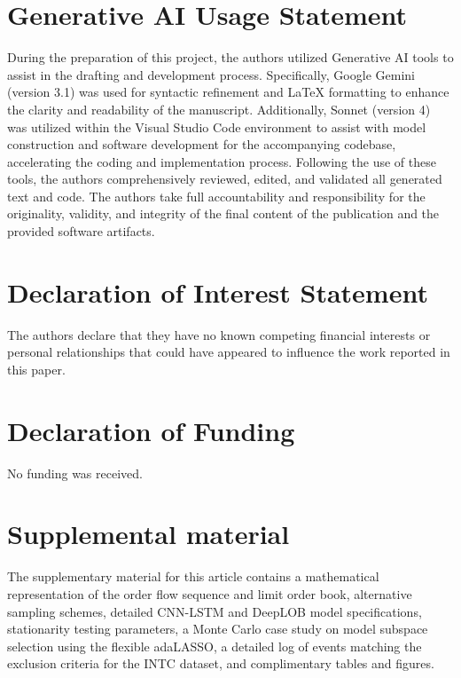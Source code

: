\documentclass{rQUF2e}
\theoremstyle{plain}
\theoremstyle{definition}
\theoremstyle{remark}
\begin{document}
\section*{Generative AI Usage Statement}
During the preparation of this project, the authors utilized Generative AI tools to assist in the drafting and development process. Specifically, Google Gemini (version 3.1) was used for syntactic refinement and LaTeX formatting to enhance the clarity and readability of the manuscript. Additionally, Sonnet (version 4) was utilized within the Visual Studio Code environment to assist with model construction and software development for the accompanying codebase, accelerating the coding and implementation process. Following the use of these tools, the authors comprehensively reviewed, edited, and validated all generated text and code. The authors take full accountability and responsibility for the originality, validity, and integrity of the final content of the publication and the provided software artifacts.

\section*{Declaration of Interest Statement}
The authors declare that they have no known competing financial interests or personal relationships that could have appeared to influence the work reported in this paper.

\section*{Declaration of Funding}
No funding was received.

\section*{Supplemental material}
The supplementary material for this article contains a mathematical representation of the order flow sequence and limit order book, alternative sampling schemes, detailed CNN-LSTM and DeepLOB model specifications, stationarity testing parameters, a Monte Carlo case study on model subspace selection using the flexible adaLASSO, a detailed log of events matching the exclusion criteria for the INTC dataset, and complimentary tables and figures.




\newpage
\end{document}
